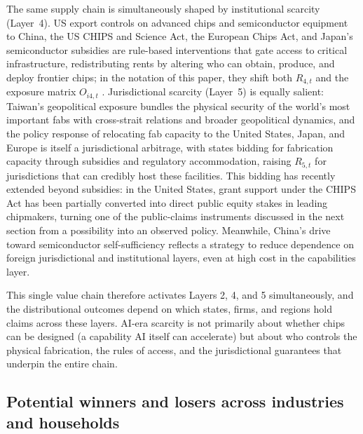 \documentclass[11pt]{article}
\begin{document}
The same supply chain is simultaneously shaped by institutional scarcity (Layer~4). US export controls on advanced chips and semiconductor equipment to China, the US CHIPS and Science Act, the European Chips Act, and Japan's semiconductor subsidies are rule-based interventions that gate access to critical infrastructure, redistributing rents by altering who can obtain, produce, and deploy frontier chips; in the notation of this paper, they shift both \(R_{4,t}\) and the exposure matrix \(O_{i4,t}\) \citep{Sastry2024ComputeGovernance, OECD2025AIInfra}. Jurisdictional scarcity (Layer~5) is equally salient: Taiwan's geopolitical exposure bundles the physical security of the world's most important fabs with cross-strait relations and broader geopolitical dynamics, and the policy response of relocating fab capacity to the United States, Japan, and Europe is itself a jurisdictional arbitrage, with states bidding for fabrication capacity through subsidies and regulatory accommodation, raising \(R_{5,t}\) for jurisdictions that can credibly host these facilities. This bidding has recently extended beyond subsidies: in the United States, grant support under the CHIPS Act has been partially converted into direct public equity stakes in leading chipmakers, turning one of the public-claims instruments discussed in the next section from a possibility into an observed policy. Meanwhile, China's drive toward semiconductor self-sufficiency reflects a strategy to reduce dependence on foreign jurisdictional and institutional layers, even at high cost in the capabilities layer.

This single value chain therefore activates Layers 2, 4, and 5 simultaneously, and the distributional outcomes depend on which states, firms, and regions hold claims across these layers. AI-era scarcity is not primarily about whether chips can be designed (a capability AI itself can accelerate) but about who controls the physical fabrication, the rules of access, and the jurisdictional guarantees that underpin the entire chain.

\subsection{Potential winners and losers across industries and households}
\label{subsec:winners_losers}
\end{document}
